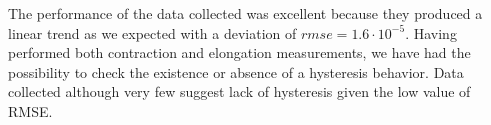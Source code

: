 The performance of the data collected was excellent because they produced a linear trend as we expected with a deviation of $rmse = 1.6 \cdot 10^{-5}$. Having performed both contraction and elongation measurements, we have had the possibility to check the existence or absence of a hysteresis behavior. Data collected although very few suggest lack of hysteresis given the low value of RMSE.

